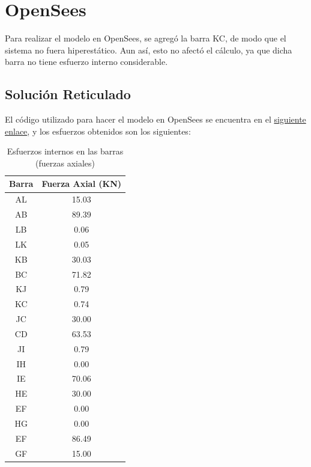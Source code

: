 \section{OpenSees}

Para realizar el modelo en OpenSees, se agregó la barra KC, de modo que el sistema no fuera hiperestático. Aun así, esto no afectó el cálculo, ya que dicha barra no tiene esfuerzo interno considerable.

\subsection{Solución Reticulado}

El código utilizado para hacer el modelo en OpenSees se encuentra en el \href{https://github.com/LukasWolff2002/PROYECTO_3_MCOC/blob/main/CODIGO/OPENSEES/E0_Wolff.py}{siguiente enlace}, y los esfuerzos obtenidos son los siguientes:

\begin{table}[H]
    \centering
    \caption{Esfuerzos internos en las barras (fuerzas axiales)}
    \label{tab:esfuerzos_internos}
    \begin{tabular}{|c|c|}
        \hline
        \textbf{Barra} & \textbf{Fuerza Axial (KN)} \\
        \hline
        AL & 15.03 \\
        AB & 89.39 \\
        LB & 0.06  \\
        LK & 0.05  \\
        KB & 30.03 \\
        BC & 71.82 \\
        KJ & 0.79  \\
        KC & 0.74  \\
        JC & 30.00 \\
        CD & 63.53 \\
        JI & 0.79  \\
        IH & 0.00  \\
        IE & 70.06 \\
        HE & 30.00 \\
        EF & 0.00  \\
        HG & 0.00  \\
        EF & 86.49 \\
        GF & 15.00 \\ \hline
    \end{tabular}
\end{table}

